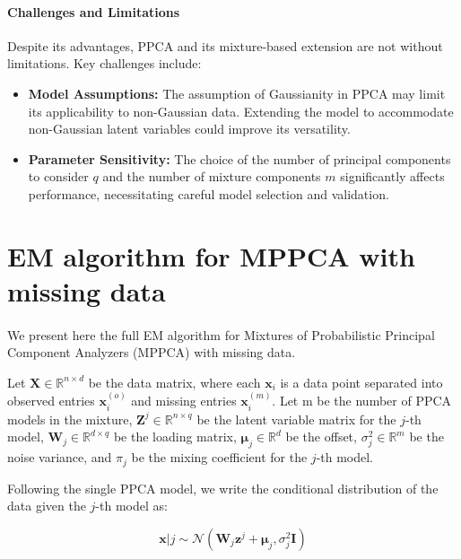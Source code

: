 \documentclass{article}
\newcommand{\R}{\mathbb{R}}
\begin{document}
\paragraph{Challenges and Limitations} Despite its advantages, PPCA and its mixture-based extension are not without limitations. Key challenges include:
\begin{itemize}
    \item \textbf{Model Assumptions:} The assumption of Gaussianity in PPCA may limit its applicability to non-Gaussian data. Extending the model to accommodate non-Gaussian latent variables could improve its versatility.
    \item \textbf{Parameter Sensitivity:} The choice of the number of principal components to consider $q$ and the number of mixture components $m$ significantly affects performance, necessitating careful model selection and validation.
\end{itemize}




\newpage
\appendix

\section{EM algorithm for MPPCA with missing data}
\label{app:mppca_EM}

\paragraph{} We present here the full EM algorithm for Mixtures of Probabilistic Principal Component Analyzers (MPPCA) with missing data.

Let $\mathbf{X} \in \R^{n \times d}$ be the data matrix, where each $\mathbf{x}_i$ is a data point separated into observed entries $\mathbf{x}_i^{(o)}$ and missing entries $\mathbf{x}_i^{(m)}$. Let m be the number of PPCA models in the mixture, $\mathbf{Z}^j \in \R^{n \times q}$ be the latent variable matrix for the $j$-th model, $\mathbf{W}_j \in \R^{d \times q}$ be the loading matrix, $\boldsymbol{\mu}_j \in \R^d$ be the offset, $\sigma_j^2 \in \R^m$ be the noise variance, and $\pi_j$ be the mixing coefficient for the $j$-th model.

Following the single PPCA model, we write the conditional distribution of the data given the $j$-th model as:

\begin{equation}
    \label{eq:mppca_EM_conditional}
    \mathbf{x} | j \sim \mathcal{N}(\mathbf{W}_j\mathbf{z}^j + \boldsymbol{\mu}_j, \sigma_j^2\mathbf{I})
\end{equation}
\end{document}
